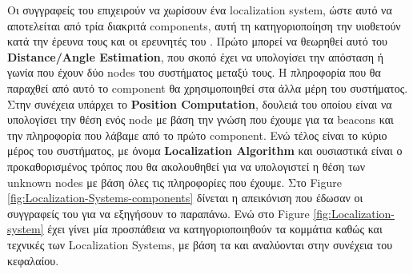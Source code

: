 Οι συγγραφείς του \cite{wsn-Localization-systems} επιχειρούν να χωρίσουν ένα localization system, ώστε 
αυτό να αποτελείται από τρία διακριτά components, αυτή τη κατηγοριοποίηση την υιοθετούν κατά την έρευνα τους και οι ερευνητές του \cite{localization-systems-components}. Πρώτο μπορεί να θεωρηθεί αυτό του \textbf{Distance/Angle Estimation}, 
που σκοπό έχει να υπολογίσει την απόσταση ή γωνία που έχουν δύο nodes του συστήματος μεταξύ τους.
Η πληροφορία που θα παραχθεί από αυτό το component θα χρησιμοποιηθεί στα άλλα μέρη του συστήματος.
Στην συνέχεια υπάρχει το \textbf{Position Computation}, δουλειά του οποίου είναι να υπολογίσει την θέση ενός
node με βάση την γνώση που έχουμε για τα beacons και την πληροφορία που λάβαμε από το πρώτο component.
Ενώ τέλος είναι το κύριο μέρος του συστήματος, με όνομα \textbf{Localization Algorithm} και ουσιαστικά είναι
ο προκαθορισμένος τρόπος που θα ακολουθηθεί για να υπολογιστεί η θέση των unknown nodes με βάση όλες τις 
πληροφορίες που έχουμε.
Στο Figure \ref{fig:Localization-Systems-components} δίνεται η απεικόνιση που έδωσαν οι συγγραφείς του 
\cite{wsn-Localization-systems} για να εξηγήσουν το παραπάνω. Ενώ στο Figure \ref{fig:Localization-system}
έχει γίνει μία προσπάθεια να κατηγοριοποιηθούν τα κομμάτια καθώς και τεχνικές των Localization Systems,
με βάση τα \cite{farooqiazam2016location} \cite{wsn-Localization-systems} \cite{wsn-Localization-techniques}
και αναλύονται στην συνέχεια του κεφαλαίου.

